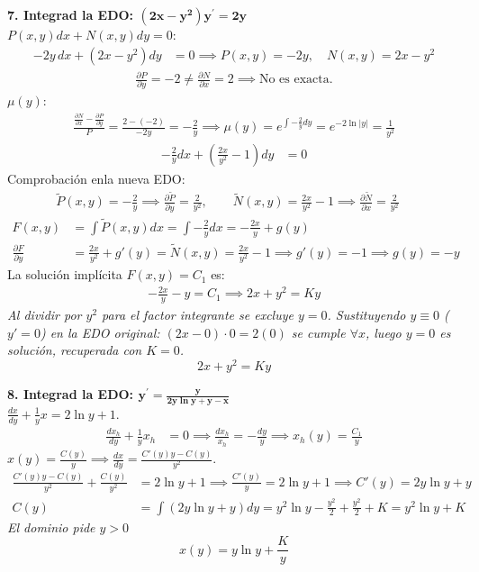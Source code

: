 \documentclass[11pt, a4paper]{article}
\begin{document}
\noindent\textbf{7. Integrad la EDO: $\bm{(2x-y^{2})y^{\prime}=2y}$} \\
$P(x,y)dx + N(x,y)dy = 0$:
\begin{align*}
-2y\,dx + (2x-y^2)dy &= 0 \implies P(x,y) = -2y, \quad N(x,y) = 2x-y^2
\end{align*}
\begin{align*}
\frac{\partial P}{\partial y} = -2 \neq \frac{\partial N}{\partial x} = 2 \implies \text{No es exacta.}
\end{align*}
$\mu(y)$:
\begin{align*}
\frac{\frac{\partial N}{\partial x} - \frac{\partial P}{\partial y}}{P} = \frac{2 - (-2)}{-2y} = -\frac{2}{y} \implies \mu(y) = e^{\int -\frac{2}{y}dy} = e^{-2\ln|y|} = \frac{1}{y^2}
\end{align*}
\begin{align*}
-\frac{2}{y}dx + \left(\frac{2x}{y^2} - 1\right)dy &= 0
\end{align*}
Comprobación enla nueva EDO:
\begin{align*}
\tilde{P}(x,y) = -\frac{2}{y} \implies \frac{\partial \tilde{P}}{\partial y} = \frac{2}{y^2}, \qquad \tilde{N}(x,y) = \frac{2x}{y^2} - 1 \implies \frac{\partial \tilde{N}}{\partial x} = \frac{2}{y^2} \quad
\end{align*}
\begin{align*}
F(x,y) &= \int \tilde{P}(x,y) dx = \int -\frac{2}{y}dx = -\frac{2x}{y} + g(y) \\
\frac{\partial F}{\partial y} &= \frac{2x}{y^2} + g'(y) = \tilde{N}(x,y) = \frac{2x}{y^2} - 1 \implies g'(y) = -1 \implies g(y) = -y
\end{align*}
La solución implícita $F(x,y) = C_1$ es:
\begin{align*}
-\frac{2x}{y} - y = C_1 \implies 2x + y^2 = Ky
\end{align*}
\textit{Al dividir por $y^2$ para el factor integrante se excluye $y=0$. Sustituyendo $y\equiv 0$ ($y'=0$) en la EDO original: $(2x-0)\cdot 0 = 2(0)$ se cumple $\forall x$, luego $y=0$ es solución, recuperada con $K=0$.}
\[
\boxed{2x + y^2 = Ky}
\]

\noindent\textbf{8. Integrad la EDO: $\bm{y^{\prime}=\frac{y}{2y\ln y+y-x}}$} \\
$\frac{dx}{dy} + \frac{1}{y}x = 2\ln y + 1$. \\

\begin{align*}
\frac{dx_h}{dy} + \frac{1}{y}x_h &= 0 \implies \frac{dx_h}{x_h} = -\frac{dy}{y} \implies x_h(y) = \frac{C_1}{y}
\end{align*}
$x(y) = \frac{C(y)}{y} \implies \frac{dx}{dy} = \frac{C'(y)y - C(y)}{y^2}$. \\
\begin{align*}
\frac{C'(y)y - C(y)}{y^2} + \frac{C(y)}{y^2} &= 2\ln y + 1 \implies \frac{C'(y)}{y} = 2\ln y + 1 \implies C'(y) = 2y\ln y + y \\
C(y) &= \int (2y\ln y + y)dy = y^2\ln y - \frac{y^2}{2} + \frac{y^2}{2} + K = y^2\ln y + K
\end{align*}
\textit{El dominio pide $y > 0$}
\[
\boxed{x(y) = y\ln y + \frac{K}{y}}
\]
\end{document}
